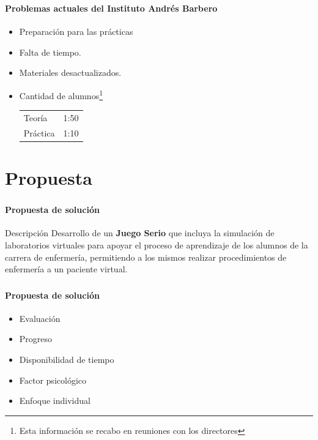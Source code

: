 \begin{frame}
\frametitle{\pagetitle}
\framesubtitle{Problemas actuales del Instituto Andrés Barbero}
\begin{itemize}[<+->]
\item Preparación para las prácticas
\item Falta de tiempo.
\item Materiales desactualizados.
\item Cantidad de alumnos\footnote{Esta información se recabo en reuniones con
        los directores}

    \bigskip

    \begin{tabular}{lr}
        \tabitem{} Teoría   & 1:50 \\
        \tabitem{} Práctica & 1:10 \\
    \end{tabular}
\end{itemize}
\end{frame}

\section{Propuesta}
\setcounter{sectiontotal}{5}

\begin{frame}
\frametitle{\pagetitle}
\framesubtitle{Propuesta de solución}
\begin{block}{Descripción}
\centering
Desarrollo de un \textbf{Juego Serio} que incluya la simulación de
laboratorios virtuales para apoyar el proceso de aprendizaje de los alumnos
de la carrera de enfermería, permitiendo a los mismos realizar
procedimientos de enfermería a un paciente virtual.
\end{block}
\end{frame}

\begin{frame}
\frametitle{\pagetitle}
\framesubtitle{Propuesta de solución}

\begin{itemize}[<+->]
\item Evaluación
\item Progreso
\item Disponibilidad de tiempo
\item Factor psicológico
\item Enfoque individual
\end{itemize}
\end{frame}


